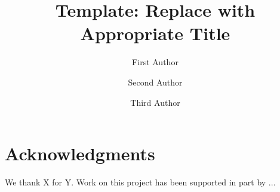 \documentclass{llncs}
\begin{document}
\title{Template: Replace with Appropriate Title}

\author{First Author \and Second Author \and Third Author}
%

\maketitle

\begin{abstract}

\end{abstract}

 
 
 
 
 

 
 


\section{Acknowledgments}

We thank X for Y. 
Work on this project has been supported in part by ...


  
\end{document}

